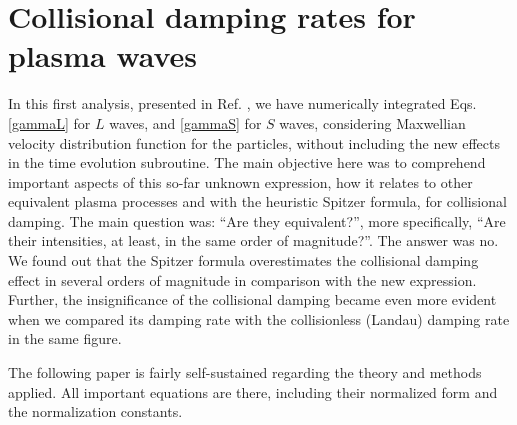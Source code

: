 \documentclass[12pt,a4paper,ruledheader]{report}
\begin{document}
\section{Collisional damping rates for plasma waves}
\label{coll-damp}
In this first analysis, presented in Ref. \cite{Tigik2016b}, we have
numerically integrated Eqs. \eqref{gammaL}
for $L$ waves, and \eqref{gammaS} for $S$ waves, considering Maxwellian
velocity distribution function for the particles, without including the
new effects in the time evolution subroutine. The main objective here
was to comprehend important aspects of this so-far unknown expression,
how it relates to other equivalent plasma processes and with the
heuristic Spitzer formula, for collisional damping. The main question
was: ``Are they equivalent?'', more specifically, ``Are their intensities,
at least, in the same order of magnitude?''. The answer was no. We found
out that the Spitzer formula overestimates the collisional damping effect
in several orders of magnitude in comparison with the new expression.
Further, the insignificance of the collisional damping became even more
evident when we compared its damping rate with the collisionless (Landau)
damping rate in the same figure.

The following paper is fairly self-sustained regarding the theory and
methods applied. All important equations are there, including their
normalized form and the normalization constants. 



\end{document}
